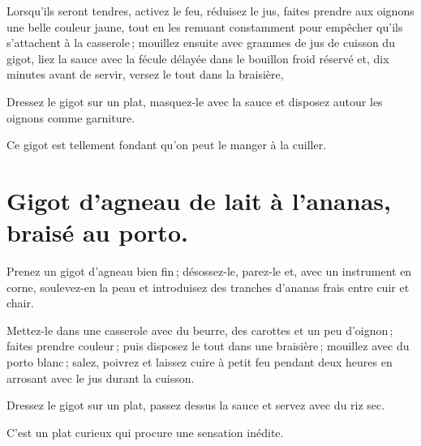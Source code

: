 Lorsqu'ils seront tendres, activez le feu, réduisez le jus, faites prendre aux
oignons une belle couleur jaune, tout en les remuant constamment pour empêcher
qu'ils s'attachent à la casserole ; mouillez ensuite avec {\mmm} grammes
de jus de cuisson du gigot, liez la sauce avec la fécule délayée dans le
bouillon froid réservé et, dix minutes avant de servir, versez le tout dans la
braisière,

Dressez le gigot sur un plat, masquez-le avec la sauce et disposez autour les
oignons comme garniture.

Ce gigot est tellement fondant qu'on peut le manger à la cuiller.

\section*{\centering Gigot d'agneau de lait à l'ananas, braisé au porto.}
{}

Prenez un gigot d'agneau bien fin ; désossez-le, parez-le et, avec un
instrument en corne, soulevez-en la peau et introduisez des tranches d'ananas
frais entre cuir et chair.

Mettez-le dans une casserole avec du beurre, des carottes et un peu d'oignon ;
faites prendre couleur ; puis disposez le tout dans une braisière ; mouillez
avec du porto blanc ; salez, poivrez et laissez cuire à petit feu pendant deux
heures en arrosant avec le jus durant la cuisson.

Dressez le gigot sur un plat, passez dessus la sauce et servez avec du riz sec.

C'est un plat curieux qui procure une sensation inédite.

